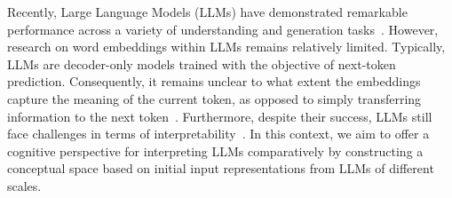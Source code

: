 
Recently, Large Language Models (LLMs) have demonstrated remarkable performance across a variety of understanding and generation tasks~\cite{openai2023gpt4}. However, research on word embeddings within LLMs remains relatively limited. Typically, LLMs are decoder-only models trained with the objective of next-token prediction. Consequently, it remains unclear to what extent the embeddings capture the meaning of the current token, as opposed to simply transferring information to the next token~\cite{liu-etal-2024-fantastic}. Furthermore, despite their success, LLMs still face challenges in terms of interpretability~\cite{zou2023representation}. In this context, we aim to offer a cognitive perspective for interpreting LLMs comparatively by constructing a conceptual space based on initial input representations from LLMs of different scales. 



